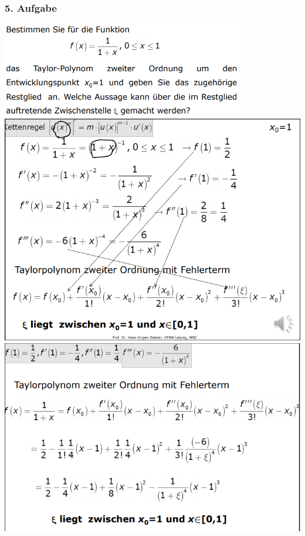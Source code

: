 \documentclass[12pt,a4paper]{article}
\begin{document}
\subsubsection{5. Aufgabe}
\includegraphics[width=0.8\textwidth]{Bilder/S1/26.png}\\
\includegraphics[width=1\textwidth]{Bilder/S1/27.png}\\
\includegraphics[width=1\textwidth]{Bilder/S1/28.png}\\
\end{document}
